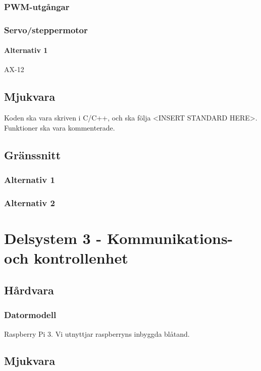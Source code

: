 \documentclass[a4paper,11pt]{article}
\begin{document}
\subsubsection{PWM-utgångar}

\subsubsection{Servo/steppermotor} \label{ssec:servomotor}
\paragraph{Alternativ 1}
AX-12

\subsection{Mjukvara}

Koden ska vara skriven i C/C++, och ska följa <INSERT STANDARD HERE>. Funktioner ska vara kommenterade.

\subsection{Gränssnitt} \label{ssec:controllInterface}

\subsubsection{Alternativ 1}

\subsubsection{Alternativ 2}


\section{Delsystem 3 - Kommunikations- och kontrollenhet}

\subsection{Hårdvara}

\subsubsection{Datormodell}
Raspberry Pi 3. Vi utnyttjar raspberryns inbyggda blåtand.

\subsection{Mjukvara}
\end{document}
